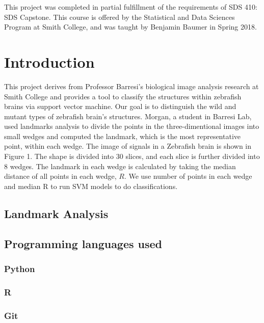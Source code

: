 \documentclass[10pt,letterpaper]{article}
\begin{document}
This project was completed in partial fulfillment of the requirements of
SDS 410: SDS Capstone. This course is offered by the Statistical and
Data Sciences Program at Smith College, and was taught by Benjamin
Baumer in Spring 2018.

\section{Introduction}\label{introduction}

This project derives from Professor Barresi's biological image analysis
research at Smith College and provides a tool to classify the structures
within zebrafish brains via support vector machine. Our goal is to
distinguish the wild and mutant types of zebrafish brain's structures.
Morgan, a student in Barresi Lab, used landmarks analysis to divide the
points in the three-dimentional images into small wedges and computed
the landmark, which is the most representative point, within each wedge.
The image of signals in a Zebrafish brain is shown in Figure 1. The
shape is divided into 30 slices, and each slice is further divided into
8 wedges. The landmark in each wedge is calculated by taking the median
distance of all points in each wedge, \(R\). We use number of points in
each wedge and median R to run SVM models to do classifications.

\subsection{Landmark Analysis}\label{landmark-analysis}

\subsection{Programming languages
used}\label{programming-languages-used}

\subsubsection{Python}\label{python}

\subsubsection{R}\label{r}

\subsubsection{Git}\label{git}
\end{document}

